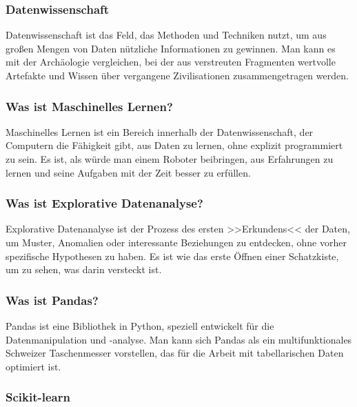 \documentclass{vorlage-design-main}
\begin{document}
\subsubsection{Datenwissenschaft}\label{datenwissenschaft}

Datenwissenschaft ist das Feld, das Methoden und Techniken nutzt, um aus
großen Mengen von Daten nützliche Informationen zu gewinnen. Man kann es
mit der Archäologie vergleichen, bei der aus verstreuten Fragmenten
wertvolle Artefakte und Wissen über vergangene Zivilisationen
zusammengetragen werden.

\subsubsection{Was ist Maschinelles
Lernen?}\label{was-ist-maschinelles-lernen}

Maschinelles Lernen ist ein Bereich innerhalb der Datenwissenschaft, der
Computern die Fähigkeit gibt, aus Daten zu lernen, ohne explizit
programmiert zu sein. Es ist, als würde man einem Roboter beibringen,
aus Erfahrungen zu lernen und seine Aufgaben mit der Zeit besser zu
erfüllen.

\subsubsection{Was ist Explorative
Datenanalyse?}\label{was-ist-explorative-datenanalyse}

Explorative Datenanalyse ist der Prozess des ersten >>Erkundens<< der
Daten, um Muster, Anomalien oder interessante Beziehungen zu entdecken,
ohne vorher spezifische Hypothesen zu haben. Es ist wie das erste Öffnen
einer Schatzkiste, um zu sehen, was darin versteckt ist.

\subsubsection{Was ist Pandas?}\label{was-ist-pandas}

Pandas ist eine Bibliothek in Python, speziell entwickelt für die
Datenmanipulation und -analyse. Man kann sich Pandas als ein
multifunktionales Schweizer Taschenmesser vorstellen, das für die Arbeit
mit tabellarischen Daten optimiert ist.

\subsubsection{Scikit-learn}\label{scikit-learn}
\end{document}
